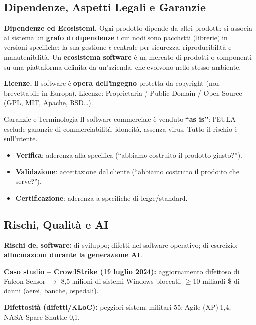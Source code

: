 \documentclass[12pt]{extarticle}
\begin{document}
\subsection{Dipendenze, Aspetti Legali e Garanzie}
\noindent \textbf{Dipendenze ed Ecosistemi.} Ogni prodotto dipende da altri prodotti: si associa al sistema un \textbf{grafo di dipendenze} i cui nodi sono pacchetti (librerie) in versioni specifiche; la sua gestione è centrale per sicurezza, riproducibilità e manutenibilità. Un \textbf{ecosistema software} è un mercato di prodotti o componenti su una piattaforma definita da un'azienda, che evolvono nello stesso ambiente.

\medskip
\noindent \textbf{Licenze.} Il software è \textbf{opera dell'ingegno} protetta da copyright (non brevettabile in Europa). Licenze: Proprietaria / Public Domain / Open Source (GPL, MIT, Apache, BSD\ldots).

\begin{cbox}{Garanzie e Terminologia}
\noindent Il software commerciale è venduto \textbf{``as is''}: l'EULA esclude garanzie di commerciabilità, idoneità, assenza virus. Tutto il rischio è sull'utente.
\begin{itemize}
    \item \textbf{Verifica}: aderenza alla specifica (``abbiamo costruito il prodotto giusto?'').
    \item \textbf{Validazione}: accettazione dal cliente (``abbiamo costruito il prodotto che serve?'').
    \item \textbf{Certificazione}: aderenza a specifiche di legge/standard.
\end{itemize}
\end{cbox}

\subsection{Rischi, Qualità e AI}\label{subsec:rischi-qualita-ai}
\noindent \textbf{Rischi del software:} di sviluppo; difetti nel software operativo; di esercizio; \textbf{allucinazioni durante la generazione AI}.

\noindent \textbf{Caso studio -- CrowdStrike (19 luglio 2024):} aggiornamento difettoso di Falcon Sensor $\to$ 8,5 milioni di sistemi Windows bloccati, $\ge$10 miliardi \$ di danni (aerei, banche, ospedali).

\noindent \textbf{Difettosità (difetti/KLoC):} peggiori sistemi militari 55; Agile (XP) 1,4; NASA Space Shuttle 0,1.
\end{document}
